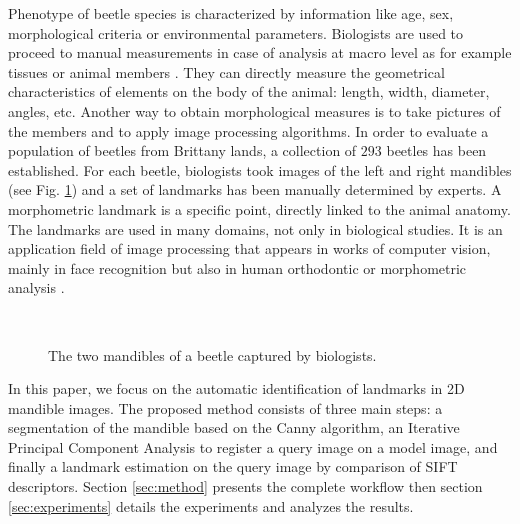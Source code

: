 \documentclass[twoside,twocolumn,10pt]{article}
\begin{document}
\copyrightspace
Phenotype of beetle species is characterized by information like age, sex, morphological criteria or environmental parameters.
 Biologists are used to proceed to manual measurements in case of analysis at macro level as for example tissues or animal members \cite{houle2003automated} \cite{bromiley2014semi}.
 They can directly measure the geometrical characteristics of elements on the body of the animal: length, width, diameter, angles, etc.
 Another way to obtain morphological measures is to take pictures of the members and to apply image processing algorithms.
 In order to evaluate a population of beetles from Brittany lands, a collection of $293$ beetles has been established.
 For each beetle, biologists took images of the left and right mandibles (see Fig. \ref{figparts}) and a set of landmarks has been manually determined by experts.
 A morphometric landmark is a specific point, directly linked to the animal anatomy.
 The landmarks are used in many domains, not only in biological studies.
 It is an application field of image processing \cite{li09} that appears in works of computer vision, mainly in face recognition \cite{zhang2014facial} but also in human orthodontic \cite{favaedi2010cephalometric} or morphometric
 analysis \cite{bec03}.

\begin{figure}[htbp]
\centering
{}~~
\caption{The two mandibles of a beetle captured by biologists.}
\label{figparts}
\end{figure}

In this paper, we focus on the automatic identification of landmarks in 2D mandible images.
The proposed method consists of three main steps: a segmentation of the mandible based on the Canny algorithm, an Iterative Principal
Component Analysis to register a query image on a model image, and finally a landmark estimation on the query image by comparison of SIFT descriptors.
Section \ref{sec:method} presents the complete workflow then section \ref{sec:experiments} details the experiments and analyzes the results.
\end{document}
